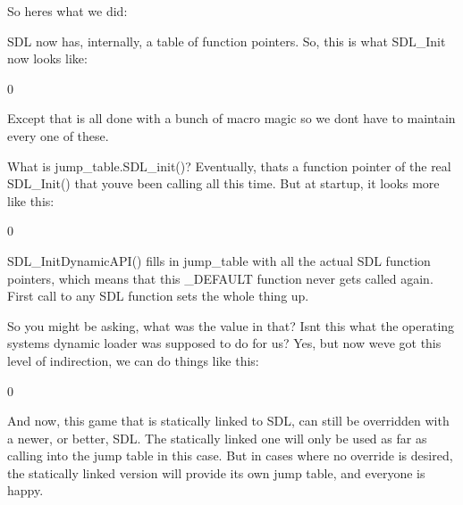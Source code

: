 So here\textquotesingle{}s what we did:\+

SDL now has, internally, a table of function pointers. So, this is what SDL\+\_\+\+Init now looks like:\+


\begin{DoxyCode}{0}
\DoxyCodeLine{\{}
\DoxyCodeLine{\}}

\end{DoxyCode}


Except that is all done with a bunch of macro magic so we don\textquotesingle{}t have to maintain every one of these.

What is jump\+\_\+table.\+SDL\+\_\+init()? Eventually, that\textquotesingle{}s a function pointer of the real SDL\+\_\+\+Init() that you\textquotesingle{}ve been calling all this time. But at startup, it looks more like this:\+


\begin{DoxyCode}{0}
\DoxyCodeLine{\{}
\DoxyCodeLine{\}}

\end{DoxyCode}


SDL\+\_\+\+Init\+Dynamic\+API() fills in jump\+\_\+table with all the actual SDL function pointers, which means that this {\ttfamily \+\_\+\+DEFAULT} function never gets called again. First call to any SDL function sets the whole thing up.

So you might be asking, what was the value in that? Isn\textquotesingle{}t this what the operating system\textquotesingle{}s dynamic loader was supposed to do for us? Yes, but now we\textquotesingle{}ve got this level of indirection, we can do things like this:\+


\begin{DoxyCode}{0}

\end{DoxyCode}


And now, this game that is statically linked to SDL, can still be overridden with a newer, or better, SDL. The statically linked one will only be used as far as calling into the jump table in this case. But in cases where no override is desired, the statically linked version will provide its own jump table, and everyone is happy.


